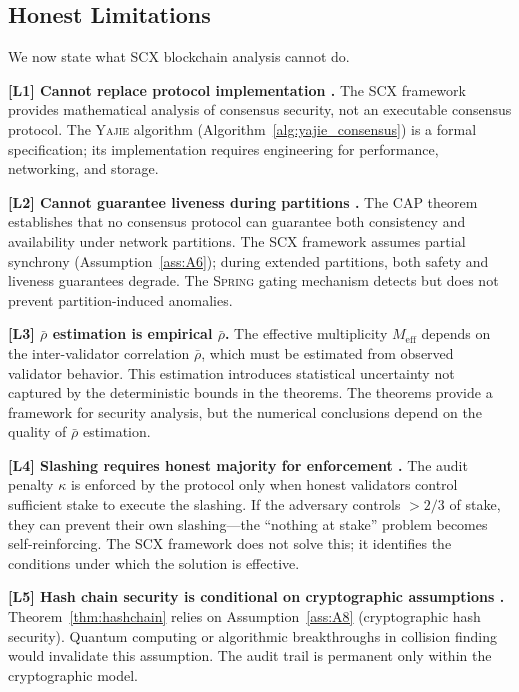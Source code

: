 \documentclass[11pt,a4paper]{article}
\theoremstyle{definition}
\newcommand{\Yajie}{\textsc{Yajie}}
\newcommand{\Spring}{\textsc{Spring}}
\newcommand{\SCX}{\textsc{SCX}}
\newcommand{\limitationTag}[1]{\textsf{\textbf{[L#1]}}}
\begin{document}
\subsection{Honest Limitations}
We now state what \SCX{} blockchain analysis cannot do.
\begin{enumerate}[label=\limitationTag{\arabic*},leftmargin=*]
    \item \textbf{\limitationTag{1} Cannot replace protocol implementation .} The \SCX{} framework provides mathematical analysis of consensus security, not an executable consensus protocol. The \Yajie{} algorithm (Algorithm~\ref{alg:yajie_consensus}) is a formal specification; its implementation requires engineering for performance, networking, and storage.
    \item \textbf{\limitationTag{2} Cannot guarantee liveness during partitions .} The CAP theorem~\cite{GilbertLynch2002} establishes that no consensus protocol can guarantee both consistency and availability under network partitions. The \SCX{} framework assumes partial synchrony (Assumption~\ref{ass:A6}); during extended partitions, both safety and liveness guarantees degrade. The \Spring{} gating mechanism detects but does not prevent partition-induced anomalies.
    \item \textbf{\limitationTag{3} $\bar{\rho}$ estimation is empirical $\bar{\rho}$.} The effective multiplicity $M_{\mathrm{eff}}$ depends on the inter-validator correlation $\bar{\rho}$, which must be estimated from observed validator behavior. This estimation introduces statistical uncertainty not captured by the deterministic bounds in the theorems. The theorems provide a framework for security analysis, but the numerical conclusions depend on the quality of $\bar{\rho}$ estimation.
    \item \textbf{\limitationTag{4} Slashing requires honest majority for enforcement .} The audit penalty $\kappa$ is enforced by the protocol only when honest validators control sufficient stake to execute the slashing. If the adversary controls $>2/3$ of stake, they can prevent their own slashing—the ``nothing at stake'' problem becomes self-reinforcing. The \SCX{} framework does not solve this; it identifies the conditions under which the solution is effective.
    \item \textbf{\limitationTag{5} Hash chain security is conditional on cryptographic assumptions .} Theorem~\ref{thm:hashchain} relies on Assumption~\ref{ass:A8} (cryptographic hash security). Quantum computing or algorithmic breakthroughs in collision finding would invalidate this assumption. The audit trail is permanent only within the cryptographic model.

\end{enumerate}
\end{document}
